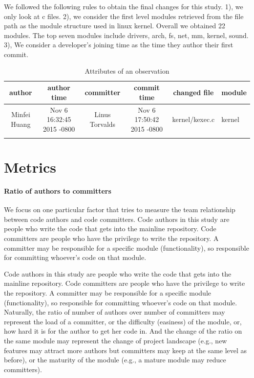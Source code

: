 \documentclass{sig-alternate-05-2015}
\begin{document}
We followed the following rules to obtain the final changes for this study.
1), we only look at c files.
2), we consider the first level modules retrieved from the file path 
as the module structure used in linux kernel. Overall we obtained 22 modules.
The top seven modules include drivers, arch, fs, net, mm, kernel, sound.
3), We consider a developer's joining time as the time they author their first commit.

\begin{table}
\centering
\caption{Attributes of an observation}
\begin{tabular}{c|c|c|c|c|l} \hline
author & author time & committer & commit time & changed file & module\\ \hline
 Minfei Huang & Nov 6 16:32:45 2015 -0800 & Linus Torvalds & Nov 6 17:50:42 2015 -0800 & kernel/kexec.c &kernel\\ \hline
\label{tab:data}
\end{tabular}
\end{table}


\section{Metrics}

\paragraph{Ratio of authors to committers}
We focus on one particular factor that tries to measure the team relationship between
code authors and code committers. Code authors in this study are people who
write the code that gets into the mainline repository. Code committers are
people who have the privilege to write the repository. A committer may be
responsible for a specific module (functionality), so responsible for committing
whoever's code on that module. 

Code authors in this study are people who
write the code that gets into the mainline repository. Code committers are
people who have the privilege to write the repository. A committer may be
responsible for a specific module (functionality), so responsible for committing
whoever's code on that module. 
Naturally, the ratio
of number of authors over number of committers may represent the load of a committer,
or the difficulty (easiness) of the module, or, how hard it is for the author to 
get her code in. And the change of the ratio on the same module may represent
the change of project landscape (e.g., new features may attract more authors but
committers may keep at the same level as before), or the maturity of the module (e.g.,
a mature module may reduce committers). 
\end{document}
